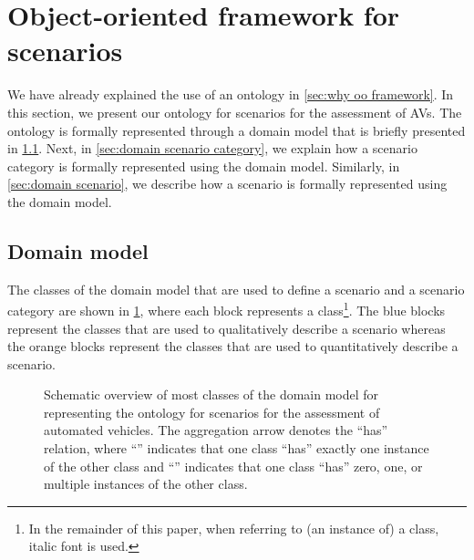 \cstartb
\section{Object-oriented framework for scenarios}
\label{sec:oo framework}
\cendb

We have already explained the use of an ontology in \cref{sec:why oo framework}. In this section, we present our ontology for scenarios for the assessment of AVs. 
The ontology is formally represented through a domain model that is briefly presented in \cref{sec:domain model}. Next, in \cref{sec:domain scenario category}, we explain how a scenario category is formally represented using the domain model. Similarly, in \cref{sec:domain scenario}, we describe how a scenario is formally represented using the domain model. 



\subsection{Domain model}
\label{sec:domain model}

The classes of the domain model that are used to define a scenario and a scenario category are shown in \cref{fig:ontology classes}, where each block represents a class\footnote{In the remainder of this paper, when referring to (an instance of) a class, italic font is used.}.
The blue blocks represent the classes that are used to qualitatively describe a scenario whereas the orange blocks represent the classes that are used to quantitatively describe a scenario. 

\begin{figure}[t]
	\centering
	
	\caption{Schematic overview of most classes of the domain model for representing the ontology for scenarios for the assessment of automated vehicles. The aggregation arrow denotes the ``has'' relation, where ``\hasone'' indicates that one class ``has'' exactly one instance of the other class and ``\hasn'' indicates that one class ``has'' zero, one, or multiple instances of the other class.}
	\label{fig:ontology classes}
\end{figure}

